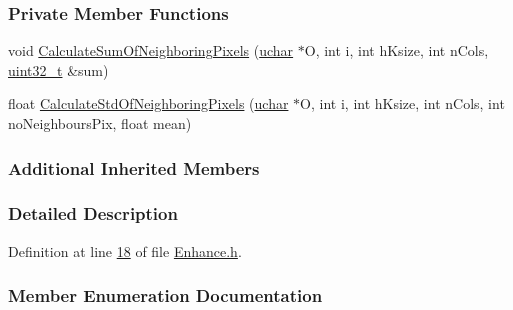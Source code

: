 \subsubsection*{Private Member Functions}
\begin{DoxyCompactItemize}
\item 
void \hyperlink{class_vision_1_1_enhance_a6ff043acf8f40873141ef3bb0af4994d}{Calculate\+Sum\+Of\+Neighboring\+Pixels} (\hyperlink{_soil_math_types_8h_a65f85814a8290f9797005d3b28e7e5fc}{uchar} $\ast$O, int i, int h\+Ksize, int n\+Cols, \hyperlink{_soil_math_types_8h_a435d1572bf3f880d55459d9805097f62}{uint32\+\_\+t} \&sum)
\item 
float \hyperlink{class_vision_1_1_enhance_ac03740bd6b3cd2936a579644c9646ce0}{Calculate\+Std\+Of\+Neighboring\+Pixels} (\hyperlink{_soil_math_types_8h_a65f85814a8290f9797005d3b28e7e5fc}{uchar} $\ast$O, int i, int h\+Ksize, int n\+Cols, int no\+Neighbours\+Pix, float mean)
\end{DoxyCompactItemize}
\subsubsection*{Additional Inherited Members}


\subsubsection{Detailed Description}


Definition at line \hyperlink{_enhance_8h_source_l00018}{18} of file \hyperlink{_enhance_8h_source}{Enhance.\+h}.



\subsubsection{Member Enumeration Documentation}
\hypertarget{class_vision_1_1_enhance_a36caf2ddf5cb2575bfae8bcdca04e58e}{}
